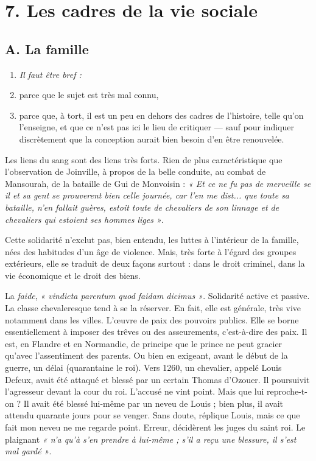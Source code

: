 \documentclass[french,twoside]{book} %
\newlength{\listmod}
\newcommand{\listhead}[1]{\hspace{-1\listmod}\emph{#1}}
\newcommand\chapteropen{} %
\newcommand\chaptercont{} %
\renewcommand\chapteropen{} %
\renewcommand\chaptercont{} %
\begin{document}
\chapteropen
\chapter[7. Les cadres de la vie sociale]{\textsc{7. }Les cadres de la vie sociale}
\label{c07}

\chaptercont
\section[A. La famille]{A. La famille}
\label{c07a}
\label{p55}
\begin{enumerate}[itemsep=0pt,]
\item[]\listhead{Il faut être bref :}
\item parce que le sujet est très mal connu,
\item parce que, à tort, il est un peu en dehors des cadres de l’histoire, telle qu’on l’enseigne, et que ce n’est pas ici le lieu de critiquer — sauf pour indiquer discrètement que la conception aurait bien besoin d’en être renouvelée.

\end{enumerate}\noindent Les liens du sang sont des liens très forts. Rien de plus caractéristique que l’observation de Joinville, à propos de la belle conduite, au combat de Mansourah, de la bataille de Gui de Monvoisin : \emph{« Et ce ne fu pas de merveille se il et sa gent se prouverent bien celle journée, car l’en me dist... que toute sa bataille, n’en fallait guères, estoit toute de chevaliers de son linnage et de chevaliers qui estoient ses hommes liges »}.\par
Cette solidarité n’exclut pas, bien entendu, les luttes à l’intérieur de la famille, nées des habitudes d’un âge de violence. Mais, très forte à l’égard des groupes extérieurs, elle se traduit de deux façons surtout : dans le droit criminel, dans la vie économique et le droit des biens.\par
La \emph{faide}, \emph{« vindicta parentum quod faidam dicimus »}. Solidarité active et passive. La classe chevaleresque tend à se la réserver. En fait, elle est générale, très vive notamment dans les villes. L’œuvre de paix des pouvoirs publics. Elle se borne essen­tiellement à imposer des trêves ou des asseurements, c’est-à-dire des paix. Il est, en Flandre et en Normandie, de principe que le prince ne peut gracier qu’avec l’assentiment des parents. Ou bien en exigeant, avant le début de la guerre, un délai (quarantaine le roi). Vers 1260, un chevalier, appelé Louis Defeux, avait été attaqué et blessé par un certain Thomas d’Ozouer. Il poursuivit l’agresseur devant la cour du roi. L’accusé ne vint point. Mais que lui reproche­-t-on ? Il avait été blessé lui-même par un neveu de Louis ; bien plus, il avait attendu quarante jours pour se venger. Sans doute, réplique Louis, mais ce que fait mon neveu ne me regarde point. Erreur, décidèrent les juges du saint roi. Le plaignant \emph{« n’a qu’à s’en prendre à lui-même ; s’il a reçu une blessure, il s’est mal gardé »}.\par
\end{document}
